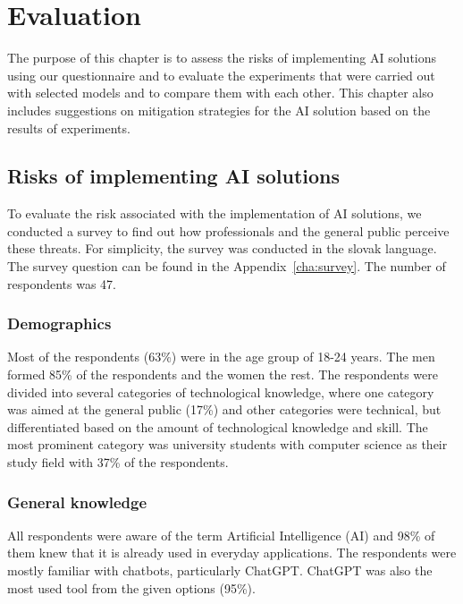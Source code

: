 \chapter{Evaluation \label{cha:eva}}



The purpose of this chapter is to assess the risks of implementing AI solutions using our questionnaire and to evaluate the experiments that were carried out with selected models and to compare them with each other. This chapter also includes suggestions on mitigation strategies for the AI solution based on the results of experiments.

\section{Risks of implementing AI solutions \label{sec:eval_risks_survey}}
To evaluate the risk associated with the implementation of AI solutions, we conducted a survey to find out how professionals and the general public perceive these threats. For simplicity, the survey was conducted in the slovak language. The survey question can be found in the Appendix~\ref{cha:survey}. The number of respondents was 47.

\subsection*{Demographics}

Most of the respondents (63\%) were in the age group of 18-24 years. The men formed 85\% of the respondents and the women the rest. The respondents were divided into several categories of technological knowledge, where one category was aimed at the general public (17\%) and other categories were technical, but differentiated based on the amount of technological knowledge and skill. The most prominent category was university students with computer science as their study field with 37\% of the respondents.

\subsection*{General knowledge}

All respondents were aware of the term Artificial Intelligence (AI) and 98\% of them knew that it is already used in everyday applications. The respondents were mostly familiar with chatbots, particularly ChatGPT. ChatGPT was also the most used tool from the given options (95\%).

